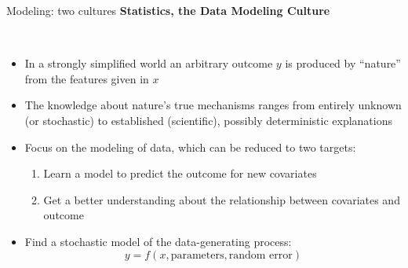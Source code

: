 \begin{vbframe}{Modeling: two cultures}
\textbf{Statistics, the Data Modeling Culture}
\begin{center}
\vspace{1cm}
   \\
\vspace{1cm}
\begin{itemize}
  \item In a strongly simplified world an arbitrary outcome $y$ is produced by \enquote{nature} from the features given in $x$
  \item The knowledge about nature's true mechanisms ranges from entirely unknown (or stochastic) to established (scientific), possibly deterministic explanations
\end{itemize}
\end{center}

\framebreak

\begin{itemize}
  \item Focus on the modeling of data, which can be reduced to two targets:
  \begin{enumerate}
    \item Learn a model to predict the outcome for new covariates
    \item Get a better understanding about the relationship between covariates and outcome
  \end{enumerate}
\end{itemize}
\begin{center}
  \end{center}
\begin{itemize}
  \item Find a stochastic model of the data-generating process:
  $$y = f(x, \text{parameters}, \text{random error})$$
\end{itemize}


\end{vbframe}
